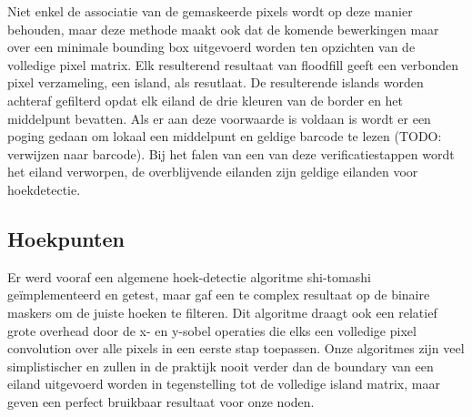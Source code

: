 Niet enkel de associatie van de gemaskeerde pixels wordt op deze manier behouden, maar deze methode maakt ook dat de komende bewerkingen maar over een minimale bounding box uitgevoerd worden ten opzichten van de volledige pixel matrix. Elk resulterend resultaat van floodfill geeft een verbonden pixel verzameling, een island, als resutlaat. De resulterende islands worden achteraf gefilterd opdat elk eiland de drie kleuren van de border en het middelpunt bevatten. Als er aan deze voorwaarde is voldaan is wordt er een poging gedaan om lokaal een middelpunt en geldige barcode te lezen (TODO: verwijzen naar barcode). Bij het falen van een van deze verificatiestappen wordt het eiland verworpen, de overblijvende eilanden zijn geldige eilanden voor hoekdetectie.

\subsection{Hoekpunten}
Er werd vooraf een algemene hoek-detectie algoritme shi-tomashi geïmplementeerd en getest, maar gaf een te complex resultaat op de binaire maskers om de juiste hoeken te filteren. Dit algoritme draagt ook een relatief grote overhead door de x- en y-sobel operaties die elks een volledige pixel convolution over alle pixels in een eerste stap toepassen. Onze algoritmes zijn veel simplistischer en zullen in de praktijk nooit verder dan de boundary van een eiland uitgevoerd worden in tegenstelling tot de volledige island matrix, maar geven een perfect bruikbaar resultaat voor onze noden.


